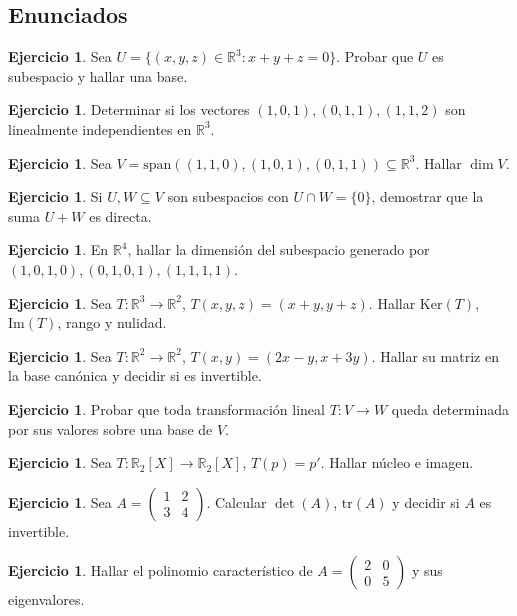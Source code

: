 \documentclass[10pt,a4paper,oneside]{article}
\theoremstyle{plain}
\theoremstyle{definition}
\newtheorem{exercise}[theorem]{Ejercicio}
\theoremstyle{remark}
\newcommand{\R}{\mathbb{R}}
\newcommand{\Ker}{\mathrm{Ker}}
\newcommand{\Ima}{\mathrm{Im}}
\newcommand{\tr}{\mathrm{tr}}
\newcommand{\Span}{\mathrm{span}}
\begin{document}
\subsection{Enunciados}
\begin{exercise}
Sea \(U=\{(x,y,z)\in\R^3:x+y+z=0\}\). Probar que \(U\) es subespacio y hallar una base.
\end{exercise}
\begin{exercise}
Determinar si los vectores \((1,0,1),(0,1,1),(1,1,2)\) son linealmente independientes en \(\R^3\).
\end{exercise}
\begin{exercise}
Sea \(V=\Span((1,1,0),(1,0,1),(0,1,1))\subseteq\R^3\). Hallar \(\dim V\).
\end{exercise}
\begin{exercise}
Si \(U,W\subseteq V\) son subespacios con \(U\cap W=\{0\}\), demostrar que la suma \(U+W\) es directa.
\end{exercise}
\begin{exercise}
En \(\R^4\), hallar la dimensión del subespacio generado por \((1,0,1,0),(0,1,0,1),(1,1,1,1)\).
\end{exercise}
\begin{exercise}
Sea \(T:\R^3\to\R^2\), \(T(x,y,z)=(x+y,y+z)\). Hallar \(\Ker(T)\), \(\Ima(T)\), rango y nulidad.
\end{exercise}
\begin{exercise}
Sea \(T:\R^2\to\R^2\), \(T(x,y)=(2x-y,x+3y)\). Hallar su matriz en la base canónica y decidir si es invertible.
\end{exercise}
\begin{exercise}
Probar que toda transformación lineal \(T:V\to W\) queda determinada por sus valores sobre una base de \(V\).
\end{exercise}
\begin{exercise}
Sea \(T:\R_2[X]\to\R_2[X]\), \(T(p)=p'\). Hallar núcleo e imagen.
\end{exercise}
\begin{exercise}
Sea \(A=\begin{pmatrix}1&2\\3&4\end{pmatrix}\). Calcular \(\det(A)\), \(\tr(A)\) y decidir si \(A\) es invertible.
\end{exercise}
\begin{exercise}
Hallar el polinomio característico de \(A=\begin{pmatrix}2&0\\0&5\end{pmatrix}\) y sus eigenvalores.
\end{exercise}
\end{document}
